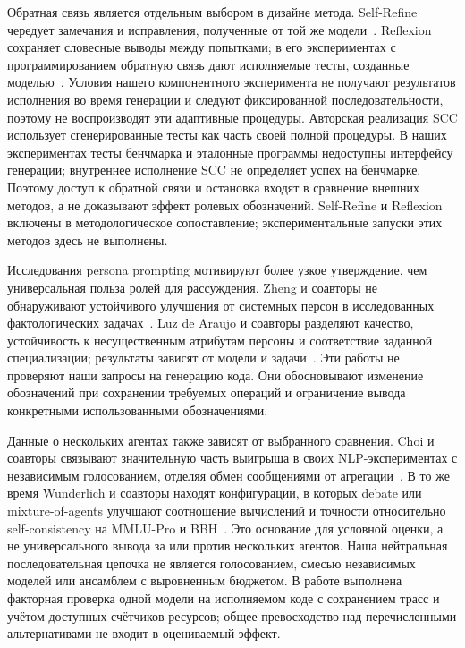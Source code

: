 Обратная связь является отдельным выбором в дизайне метода. Self-Refine чередует замечания и исправления, полученные от той же модели~\cite{madaan2023selfrefine}. Reflexion сохраняет словесные выводы между попытками; в его экспериментах с программированием обратную связь дают исполняемые тесты, созданные моделью~\cite{shinn2023reflexion}. Условия нашего компонентного эксперимента не получают результатов исполнения во время генерации и следуют фиксированной последовательности, поэтому не воспроизводят эти адаптивные процедуры. Авторская реализация SCC использует сгенерированные тесты как часть своей полной процедуры. В наших экспериментах тесты бенчмарка и эталонные программы недоступны интерфейсу генерации; внутреннее исполнение SCC не определяет успех на бенчмарке. Поэтому доступ к обратной связи и остановка входят в сравнение внешних методов, а не доказывают эффект ролевых обозначений. Self-Refine и Reflexion включены в методологическое сопоставление; экспериментальные запуски этих методов здесь не выполнены.

Исследования persona prompting мотивируют более узкое утверждение, чем универсальная польза ролей для рассуждения. Zheng и соавторы не обнаруживают устойчивого улучшения от системных персон в исследованных фактологических задачах~\cite{zheng2024personas}. Luz de Araujo и соавторы разделяют качество, устойчивость к несущественным атрибутам персоны и соответствие заданной специализации; результаты зависят от модели и задачи~\cite{araujo2025personas}. Эти работы не проверяют наши запросы на генерацию кода. Они обосновывают изменение обозначений при сохранении требуемых операций и ограничение вывода конкретными использованными обозначениями.

Данные о нескольких агентах также зависят от выбранного сравнения. Choi и соавторы связывают значительную часть выигрыша в своих NLP-экспериментах с независимым голосованием, отделяя обмен сообщениями от агрегации~\cite{choi2025debate}. В то же время Wunderlich и соавторы находят конфигурации, в которых debate или mixture-of-agents улучшают соотношение вычислений и точности относительно self-consistency на MMLU-Pro и BBH~\cite{wunderlich2026compute}. Это основание для условной оценки, а не универсального вывода за или против нескольких агентов. Наша нейтральная последовательная цепочка не является голосованием, смесью независимых моделей или ансамблем с выровненным бюджетом. В работе выполнена факторная проверка одной модели на исполняемом коде с сохранением трасс и учётом доступных счётчиков ресурсов; общее превосходство над перечисленными альтернативами не входит в оцениваемый эффект.

